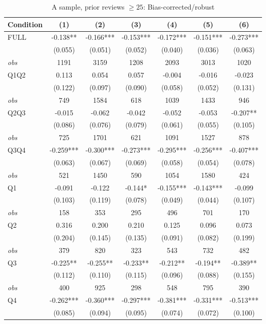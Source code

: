 \begin{table}[!htbp]
\centering
\caption{A sample, prior reviews $\geq25$: Bias-corrected/robust}
\begin{tabular}{lcccccc}
\toprule
Condition & (1) & (2) & (3) & (4) & (5) & (6) \\
\midrule
FULL & -0.138** & -0.166*** & -0.153*** & -0.172*** & -0.151*** & -0.273*** \\
 & (0.055) & (0.051) & (0.052) & (0.040) & (0.036) & (0.063) \\
\textit{obs} & 1191 & 3159 & 1208 & 2093 & 3013 & 1020 \\
Q1Q2 & 0.113 & 0.054 & 0.057 & -0.004 & -0.016 & -0.023 \\
 & (0.122) & (0.097) & (0.090) & (0.058) & (0.052) & (0.131) \\
\textit{obs} & 749 & 1584 & 618 & 1039 & 1433 & 946 \\
Q2Q3 & -0.015 & -0.062 & -0.042 & -0.052 & -0.053 & -0.207** \\
 & (0.086) & (0.076) & (0.079) & (0.061) & (0.055) & (0.105) \\
\textit{obs} & 725 & 1701 & 621 & 1091 & 1527 & 878 \\
Q3Q4 & -0.259*** & -0.300*** & -0.273*** & -0.295*** & -0.256*** & -0.407*** \\
 & (0.063) & (0.067) & (0.069) & (0.058) & (0.054) & (0.078) \\
\textit{obs} & 521 & 1450 & 590 & 1054 & 1580 & 424 \\
Q1 & -0.091 & -0.122 & -0.144* & -0.155*** & -0.143*** & -0.099 \\
 & (0.103) & (0.119) & (0.078) & (0.049) & (0.044) & (0.107) \\
\textit{obs} & 158 & 353 & 295 & 496 & 701 & 170 \\
Q2 & 0.316 & 0.200 & 0.210 & 0.125 & 0.096 & 0.073 \\
 & (0.204) & (0.145) & (0.135) & (0.091) & (0.082) & (0.199) \\
\textit{obs} & 379 & 820 & 323 & 543 & 732 & 482 \\
Q3 & -0.225** & -0.255** & -0.233** & -0.212** & -0.194** & -0.389** \\
 & (0.112) & (0.110) & (0.115) & (0.096) & (0.088) & (0.155) \\
\textit{obs} & 400 & 925 & 298 & 548 & 795 & 390 \\
Q4 & -0.262*** & -0.360*** & -0.297*** & -0.381*** & -0.331*** & -0.513*** \\
 & (0.085) & (0.094) & (0.095) & (0.074) & (0.072) & (0.100) \\

\end{tabular}
\end{table}

